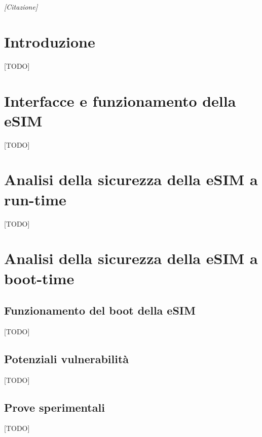 \documentclass[10pt, twoside, openany]{book}
\begin{document}
\begin{frontespizio}
\end{frontespizio}

\begin{flushright}
\null{}
\textit{[Citazione]}
\null
\end{flushright}

\tableofcontents
\listoffigures
\listoftables

\chapter{Introduzione}
[TODO]

\chapter{Interfacce e funzionamento della eSIM}
[TODO]


\chapter{Analisi della sicurezza della eSIM a run-time}
[TODO]

\chapter{Analisi della sicurezza della eSIM a boot-time}
\section{Funzionamento del boot della eSIM}
[TODO]

\section{Potenziali vulnerabilità}
[TODO]

\section{Prove sperimentali}
[TODO]
\end{document}
